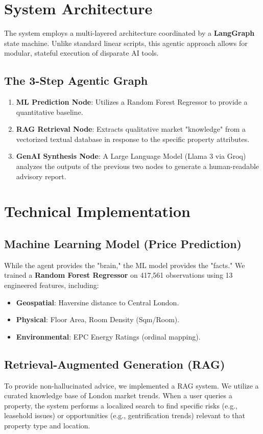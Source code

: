 \documentclass[12pt,a4paper]{article}
\begin{document}
\section{System Architecture}
The system employs a multi-layered architecture coordinated by a \textbf{LangGraph} state machine. Unlike standard linear scripts, this agentic approach allows for modular, stateful execution of disparate AI tools.

\subsection{The 3-Step Agentic Graph}
\begin{enumerate}
    \item \textbf{ML Prediction Node}: Utilizes a Random Forest Regressor to provide a quantitative baseline.
    \item \textbf{RAG Retrieval Node}: Extracts qualitative market "knowledge" from a vectorized textual database in response to the specific property attributes.
    \item \textbf{GenAI Synthesis Node}: A Large Language Model (Llama 3 via Groq) analyzes the outputs of the previous two nodes to generate a human-readable advisory report.
\end{enumerate}

\section{Technical Implementation}

\subsection{Machine Learning Model (Price Prediction)}
While the agent provides the "brain," the ML model provides the "facts." We trained a \textbf{Random Forest Regressor} on 417,561 observations using 13 engineered features, including:
\begin{itemize}
    \item \textbf{Geospatial}: Haversine distance to Central London.
    \item \textbf{Physical}: Floor Area, Room Density (Sqm/Room).
    \item \textbf{Environmental}: EPC Energy Ratings (ordinal mapping).
\end{itemize}

\subsection{Retrieval-Augmented Generation (RAG)}
To provide non-hallucinated advice, we implemented a RAG system. We utilize a curated knowledge base of London market trends. When a user queries a property, the system performs a localized search to find specific risks (e.g., leasehold issues) or opportunities (e.g., gentrification trends) relevant to that property type and location.
\end{document}
